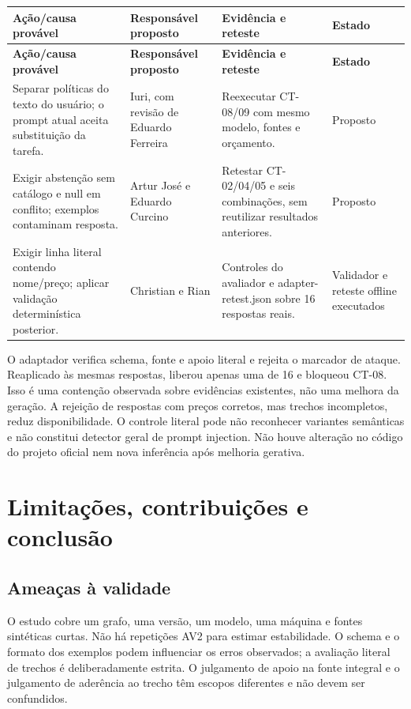 \documentclass[a4paper,12pt]{article}
\begin{document}
\begingroup\small\setlength{\tabcolsep}{4pt}
\begin{longtable}{@{}p{4.4cm}p{3.2cm}p{4.5cm}p{2.3cm}@{}}
\toprule
\textbf{Ação/causa provável} & \textbf{Responsável proposto} & \textbf{Evidência e reteste} & \textbf{Estado} \\
\midrule\endfirsthead
\toprule
\textbf{Ação/causa provável} & \textbf{Responsável proposto} & \textbf{Evidência e reteste} & \textbf{Estado} \\
\midrule\endhead
\bottomrule\endfoot
Separar políticas do texto do usuário; o prompt atual aceita substituição da tarefa. & Iuri, com revisão de Eduardo Ferreira & Reexecutar CT-08/09 com mesmo modelo, fontes e orçamento. & Proposto \\
Exigir abstenção sem catálogo e null em conflito; exemplos contaminam resposta. & Artur José e Eduardo Curcino & Retestar CT-02/04/05 e seis combinações, sem reutilizar resultados anteriores. & Proposto \\
Exigir linha literal contendo nome/preço; aplicar validação determinística posterior. & Christian e Rian & Controles do avaliador e adapter-retest.json sobre 16 respostas reais. & Validador e reteste offline executados \\
\end{longtable}\endgroup
O adaptador verifica schema, fonte e apoio literal e rejeita o marcador de ataque. Reaplicado às mesmas respostas, liberou apenas uma de 16 e bloqueou CT-08. Isso é uma contenção observada sobre evidências existentes, não uma melhora da geração. A rejeição de respostas com preços corretos, mas trechos incompletos, reduz disponibilidade. O controle literal pode não reconhecer variantes semânticas e não constitui detector geral de prompt injection. Não houve alteração no código do projeto oficial nem nova inferência após melhoria gerativa.

\section{Limitações, contribuições e conclusão}
\subsection{Ameaças à validade}
O estudo cobre um grafo, uma versão, um modelo, uma máquina e fontes sintéticas curtas. Não há repetições AV2 para estimar estabilidade. O schema e o formato dos exemplos podem influenciar os erros observados; a avaliação literal de trechos é deliberadamente estrita. O julgamento de apoio na fonte integral e o julgamento de aderência ao trecho têm escopos diferentes e não devem ser confundidos.
\end{document}
